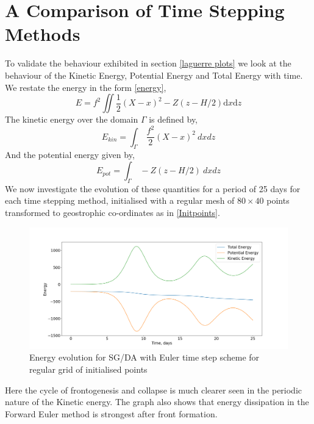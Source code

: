 \section{A Comparison of Time Stepping Methods}
To validate the behaviour exhibited in section \ref{laguerre plots} we look at the behaviour of the Kinetic Energy, Potential Energy and Total Energy with time. We restate the energy in the form \ref{energy},
\begin{equation}
	E= f^2 \iint \frac{1}{2}\left(X-x\right)^2 - Z\left(z - H/2\right)\textrm{d}x\textrm{d}z
\end{equation}
The kinetic energy over the domain $\Gamma$ is defined by,
\begin{equation}
	E_{kin} = \int_\Gamma \ \frac{f^2}{2}(X-x)^2 \ dxdz
\label{KE}
\end{equation}
And the potential energy given by,
\begin{equation}
E_{pot} = \int_\Gamma \ - Z\left(z - H/2\right) \ dxdz
\label{PE}
\end{equation}
We now investigate the evolution of these quantities for a period of 25 days for each time stepping method, initialised with a regular mesh of $80 \times 40$ points transformed to geostrophic co-ordinates as in \ref{Initpoints}.
\begin{figure}[h]
	\centering
	\includegraphics[width=1.0\linewidth]{evaluation/Energy_evolution_euler}
	\caption[Energy evolution for SG/DA with Euler time step scheme]{Energy evolution for SG/DA with Euler time step scheme for regular grid of initialised points}
	\label{fig:energyevolutioneuler}
\end{figure}
Here the cycle of frontogenesis and collapse is much clearer seen in the periodic nature of the Kinetic energy. The graph also shows that energy dissipation in the Forward Euler method is strongest after front formation.
